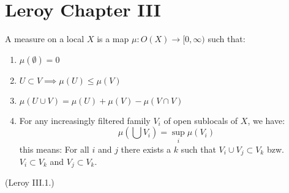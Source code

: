 \begin{comment}
\begin{lemma}[$b(X)$ generates sublocals]
    Every sublocal $X$ is an intersection of elements of $b(X)$.
    \label{lem:b_X_generates_sublocals}
    \uses{def:induced_boolean_algebra}
\end{lemma}


\begin{lemma}[Union of Intersections]
(Leroy Lemme 2.4)
    \label{lem:union_of_intersections}
    \uses{def:sublocal_intersection,prop:boolean_algebra,lem:b_X_generates_sublocals}
    For any family $B_i$ of sublocals of a local $E$ and a sublocal $A$, we have:
    \[A \cup (\bigcap_i B_i) = \bigcap_i (A \cap B_i)\]
    This implies if $A_i$ and $B_j$ are families of sublocals of $X$, we have:
    \[(\bigcap_i A_i)\cup(\bigcap_j B_j) =  \bigcap_{ij}(A_i \cup B_j)\]
\end{lemma}


\begin{theorem}[Preimage commutes with unions]
(Leroy resultat principal)
    \label{thm:preimage_commutes_with_unions}
    \uses{lem:union_of_intersections,def:inverse_images}
    For any morphism $f$ of locals, we have:
    \[f^{-1}(A \cup B) = f^{-1}(A) \cup f^{-1}(B)\]
\end{theorem}

\end{comment}
\chapter{Leroy Chapter III}\label{sec:leroy-chapter-iii}
\begin{definition}
    \label{def:measure_on_locals}
    \leanok
    A measure on a local $X$ is a map $\mu : O(X) \to [0,\infty)$ such that:
    \begin{enumerate}
        \item $\mu(\emptyset) = 0$
        \item $U \subset V \implies \mu(U) \le \mu(V)$
        \item $\mu(U \cup V) = \mu(U) + \mu(V) - \mu(V \cap V)$
        \item For any increasingly filtered family $V_i$ of open sublocals of $X$, we have:
        \[\mu(\bigcup V_i) = \sup_i \mu(V_i)\] this means:
        For all $i$ and $j$ there exists a $k$ such that $V_i \cup V_j \subset V_k$ bzw. $V_i \subset V_k$ and $V_j \subset V_k$.
    \end{enumerate}
    (Leroy III.1.)
\end{definition}

